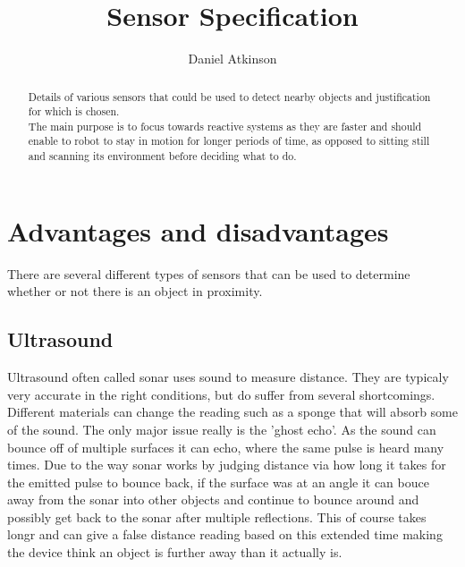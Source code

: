 \documentclass{article}
\begin{document}
\title{Sensor Specification}

\author{Daniel Atkinson}

\maketitle

\begin{abstract}

Details of various sensors that could be used to detect nearby objects and justification for which is chosen.
\\The main purpose is to focus towards reactive systems as they are faster and should enable to robot to stay in motion for longer periods of time, as opposed to sitting still and scanning its environment before deciding what to do.

\end{abstract}


\section{Advantages and disadvantages}
There are several different types of sensors that can be used to determine whether or not there is an object in proximity.

\subsection{Ultrasound}
Ultrasound often called sonar uses sound to measure distance.  They are typicaly very accurate in the right conditions, but do suffer from several shortcomings.
\\Different materials can change the reading such as a sponge that will absorb some of the sound.  The only major issue really is the 'ghost echo'.  As the sound can bounce off of multiple surfaces it can echo, where the same pulse is heard many times.  Due to the way sonar works by judging distance via how long it takes for the emitted pulse to bounce back, if the surface was at an angle it can bouce away from the sonar into other objects and continue to bounce around and possibly get back to the sonar after multiple reflections.  This of course takes longr and can give a false distance reading based on this extended time making the device think an object is further away than it actually is.
\end{document}
